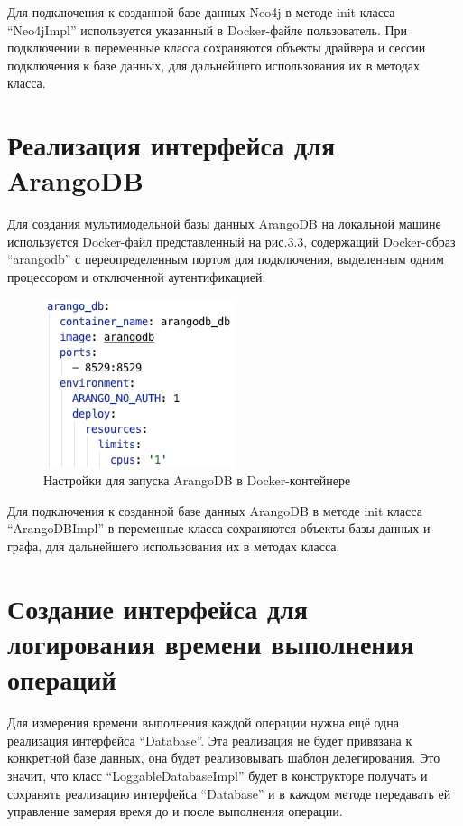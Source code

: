 Для подключения к созданной базе данных Neo4j в методе init класса “Neo4jImpl” используется указанный в Docker-файле пользователь. При
подключении в переменные класса сохраняются объекты драйвера и сессии подключения к базе данных, для дальнейшего использования их в методах класса.


\section{Реализация интерфейса для ArangoDB}

Для создания мультимодельной базы данных ArangoDB на локальной машине используется Docker-файл представленный на рис.3.3, содержащий
Docker-образ “arangodb” с переопределенным портом для подключения, выделенным одним процессором и отключенной аутентификацией.

\begin{figure}[ht!]
    \center
    \includegraphics [scale=0.7] {my_folder/myimg//6}
    \caption{Настройки для запуска ArangoDB в Docker-контейнере}
\end{figure}

Для подключения к созданной базе данных ArangoDB в методе init класса “ArangoDBImpl” в переменные класса сохраняются объекты базы данных и
графа, для дальнейшего использования их в методах класса.


\section{Создание интерфейса для логирования времени выполнения операций}

Для измерения времени выполнения каждой операции нужна ещё одна реализация интерфейса “Database”. Эта реализация не будет привязана к
конкретной базе данных, она будет реализовывать шаблон делегирования. Это значит, что класс “LoggableDatabaseImpl” будет в конструкторе
получать и сохранять реализацию интерфейса “Database” и в каждом методе передавать ей управление замеряя время до и после выполнения операции.



